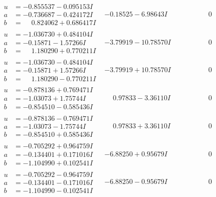 \documentclass[1p]{elsarticle_modified}
\theoremstyle{definition}
\begin{document}
$$\begin{array}{c|c|c}
\begin{aligned}
u &= -0.855537 - 0.095153 I \\
a &= -0.736687 - 0.424172 I \\
b &= \phantom{-}0.824062 + 0.686417 I\end{aligned}
 & -0.18525 - 6.98643 I & \phantom{-0.000000 } 0 \\ \hline\begin{aligned}
u &= -1.036730 + 0.484104 I \\
a &= -0.15871 - 1.57266 I \\
b &= \phantom{-}1.180290 + 0.770211 I\end{aligned}
 & -3.79919 - 10.78570 I & \phantom{-0.000000 } 0 \\ \hline\begin{aligned}
u &= -1.036730 - 0.484104 I \\
a &= -0.15871 + 1.57266 I \\
b &= \phantom{-}1.180290 - 0.770211 I\end{aligned}
 & -3.79919 + 10.78570 I & \phantom{-0.000000 } 0 \\ \hline\begin{aligned}
u &= -0.878136 + 0.769471 I \\
a &= -1.03073 + 1.75744 I \\
b &= -0.854510 - 0.585436 I\end{aligned}
 & \phantom{-}0.97833 - 3.36110 I & \phantom{-0.000000 } 0 \\ \hline\begin{aligned}
u &= -0.878136 - 0.769471 I \\
a &= -1.03073 - 1.75744 I \\
b &= -0.854510 + 0.585436 I\end{aligned}
 & \phantom{-}0.97833 + 3.36110 I & \phantom{-0.000000 } 0 \\ \hline\begin{aligned}
u &= -0.705292 + 0.964759 I \\
a &= -0.134401 + 0.171016 I \\
b &= -1.104990 + 0.102541 I\end{aligned}
 & -6.88250 + 0.95679 I & \phantom{-0.000000 } 0 \\ \hline\begin{aligned}
u &= -0.705292 - 0.964759 I \\
a &= -0.134401 - 0.171016 I \\
b &= -1.104990 - 0.102541 I\end{aligned}
 & -6.88250 - 0.95679 I & \phantom{-0.000000 } 0 \\ \hline\begin{aligned}

\end{aligned}
\end{array}$$
\end{document}

